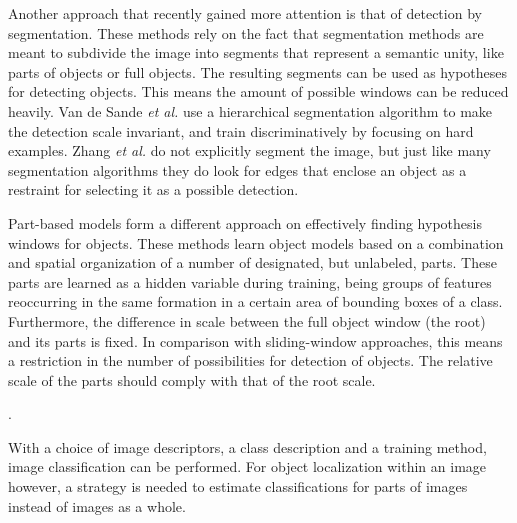 Another approach that recently gained more attention is that of detection by segmentation.\cite{van2011segmentation,zhang2010free} These methods rely on the fact that segmentation methods are meant to subdivide the image into segments that represent a semantic unity, like parts of objects or full objects. The resulting segments can be used as hypotheses for detecting objects. This means the amount of possible windows can be reduced heavily. Van de Sande \emph{et al.}\cite{van2011segmentation} use a hierarchical segmentation algorithm to make the detection scale invariant, and train discriminatively by focusing on hard examples. Zhang \emph{et al.}\cite{zhang2010free} do not explicitly segment the image, but just like many segmentation algorithms they do look for edges that enclose an object as a restraint for selecting it as a possible detection.

Part-based models form a different approach on effectively finding hypothesis windows for objects.\cite{felzenszwalb2010object} These methods learn object models based on a combination and spatial organization of a number of designated, but unlabeled, parts. These parts are learned as a hidden variable during training, being groups of features reoccurring in the same formation in a certain area of bounding boxes of a class. Furthermore, the difference in scale between the full object window (the root) and its parts is fixed. In comparison with sliding-window approaches, this means a restriction in the number of possibilities for detection of objects. The relative scale of the parts should comply with that of the root scale. 

\begin{figure}[hbt]
    \centering
\end{figure}

.

With a choice of image descriptors, a class description and a training method, image classification can be performed. For object localization within an image however, a strategy is needed to estimate classifications for parts of images instead of images as a whole.

